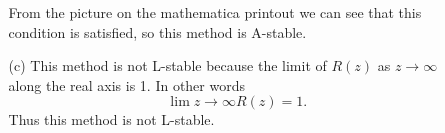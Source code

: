 \documentclass[11pt, oneside, titlepage]{article}
\begin{document}
\begin{enumerate}
\begin{enumerate}
                    From the picture on the mathematica printout we can see that this
                    condition is satisfied, so this method is A-stable.

            \item[(c)]
                This method is not L-stable because the limit of $R(z)$ as
                $z \to \infty$ along the real axis is 1.
                In other words
                \[
                    \lim{z \to \infty}{R(z)} = 1.
                \]
                Thus this method is not L-stable.
        \end{enumerate}
\end{enumerate}
\end{document}
